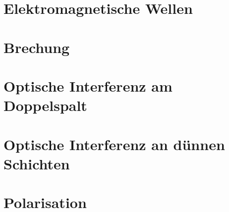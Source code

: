 \section{Elektromagnetische Wellen} \label{sec:em_wellen}


\section{Brechung} \label{sec:brechung}


\section{Optische Interferenz am Doppelspalt} \label{sec:interferenz_spalt}


\section{Optische Interferenz an dünnen Schichten} \label{sec:interferenz_schicht}


\section{Polarisation} \label{sec:polarisation}
